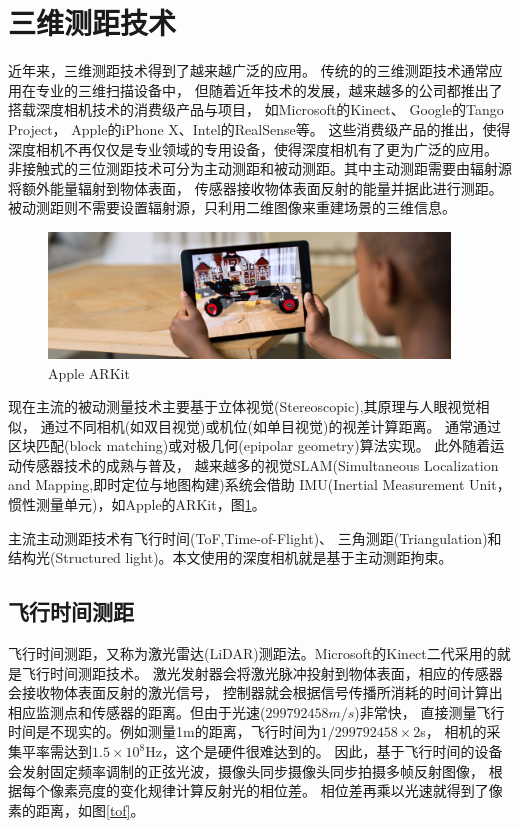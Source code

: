 \section{三维测距技术}
近年来，三维测距技术得到了越来越广泛的应用。
传统的的三维测距技术通常应用在专业的三维扫描设备中，
但随着近年技术的发展，越来越多的公司都推出了搭载深度相机技术的消费级产品与项目，
如Microsoft的Kinect\cite{microsoft_kinect}、
Google的Tango\cite{google_tango} Project，
Apple的iPhone X\cite{apple_iphoneX}、Intel的RealSense\cite{intel_realsense}等。
这些消费级产品的推出，使得深度相机不再仅仅是专业领域的专用设备，使得深度相机有了更为广泛的应用。
非接触式的三位测距技术可分为主动测距和被动测距。其中主动测距需要由辐射源将额外能量辐射到物体表面，
传感器接收物体表面反射的能量并据此进行测距。被动测距则不需要设置辐射源，只利用二维图像来重建场景的三维信息。

\begin{figure}[h]
    \centering
    \includegraphics[width=0.95\textwidth]{./Pictures/ARKit.eps}
    \caption{Apple ARKit}
    \label{arkit}
\end{figure}
现在主流的被动测量技术主要基于立体视觉(Stereoscopic),其原理与人眼视觉相似，
通过不同相机(如双目视觉)或机位(如单目视觉)的视差计算距离。
通常通过区块匹配(block matching)或对极几何(epipolar geometry)算法实现。
此外随着运动传感器技术的成熟与普及，
越来越多的视觉SLAM(Simultaneous Localization and Mapping,即时定位与地图构建)系统会借助
IMU(Inertial Measurement Unit，惯性测量单元)，如Apple的ARKit\cite{apple_arkit}，图\ref{arkit}。

主流主动测距技术有飞行时间(ToF,Time-of-Flight)、
三角测距(Triangulation)和结构光(Structured light)。本文使用的深度相机就是基于主动测距拘束。
\subsection{飞行时间测距}
飞行时间测距，又称为激光雷达(LiDAR)测距法。Microsoft的Kinect二代采用的就是飞行时间测距技术。
激光发射器会将激光脉冲投射到物体表面，相应的传感器会接收物体表面反射的激光信号，
控制器就会根据信号传播所消耗的时间计算出相应监测点和传感器的距离。但由于光速(\(299792458 m/s\))非常快，
直接测量飞行时间是不现实的。例如测量1m的距离，飞行时间为\(1/299792458 \times 2\)s，
相机的采集平率需达到\(1.5 \times 10^8\)Hz，这个是硬件很难达到的。
因此，基于飞行时间的设备会发射固定频率调制的正弦光波，摄像头同步摄像头同步拍摄多帧反射图像，
根据每个像素亮度的变化规律计算反射光的相位差。
相位差再乘以光速就得到了像素的距离，如图\ref{tof}。


